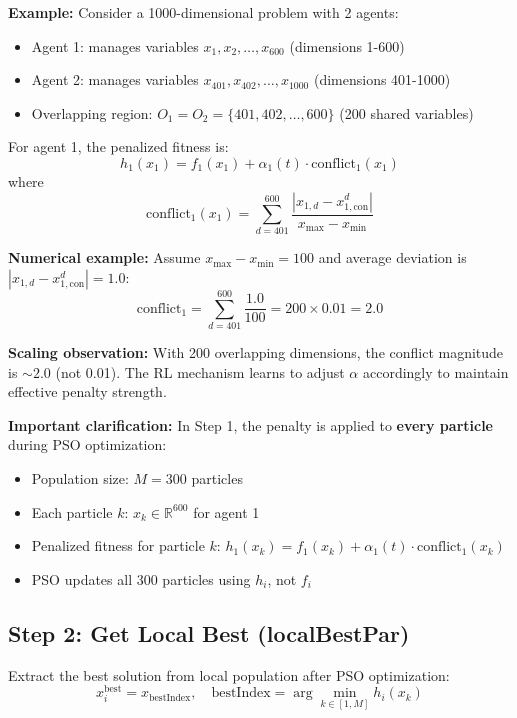 \documentclass[11pt,a4paper]{article}
\begin{document}
\textbf{Example:} Consider a 1000-dimensional problem with 2 agents:
\begin{itemize}
    \item Agent 1: manages variables $x_1, x_2, \ldots, x_{600}$ (dimensions 1-600)
    \item Agent 2: manages variables $x_{401}, x_{402}, \ldots, x_{1000}$ (dimensions 401-1000)
    \item Overlapping region: $O_1 = O_2 = \{401, 402, \ldots, 600\}$ (200 shared variables)
\end{itemize}
For agent 1, the penalized fitness is:
\begin{equation}
h_1(x_1) = f_1(x_1) + \alpha_1(t) \cdot \text{conflict}_1(x_1)
\end{equation}
where
\begin{equation}
\text{conflict}_1(x_1) = \sum_{d=401}^{600} \frac{|x_{1,d} - x_{1,\text{con}}^d|}{x_{\max} - x_{\min}}
\end{equation}

\textbf{Numerical example:} Assume $x_{\max} - x_{\min} = 100$ and average deviation is $|x_{1,d} - x_{1,\text{con}}^d| = 1.0$:
\begin{equation}
\text{conflict}_1 = \sum_{d=401}^{600} \frac{1.0}{100} = 200 \times 0.01 = 2.0
\end{equation}

\textbf{Scaling observation:} With 200 overlapping dimensions, the conflict magnitude is $\sim 2.0$ (not 0.01). The RL mechanism learns to adjust $\alpha$ accordingly to maintain effective penalty strength.

\textbf{Important clarification:} In Step 1, the penalty is applied to \textbf{every particle} during PSO optimization:
\begin{itemize}
    \item Population size: $M = 300$ particles
    \item Each particle $k$: $x_k \in \mathbb{R}^{600}$ for agent 1
    \item Penalized fitness for particle $k$: $h_1(x_k) = f_1(x_k) + \alpha_1(t) \cdot \text{conflict}_1(x_k)$
    \item PSO updates all 300 particles using $h_i$, not $f_i$
\end{itemize}

\subsection{Step 2: Get Local Best (localBestPar)}
Extract the best solution from local population after PSO optimization:
\begin{equation}
x_i^{\text{best}} = x_{\text{bestIndex}}, \quad \text{bestIndex} = \arg\min_{k \in [1,M]} h_i(x_k)
\end{equation}
\end{document}
